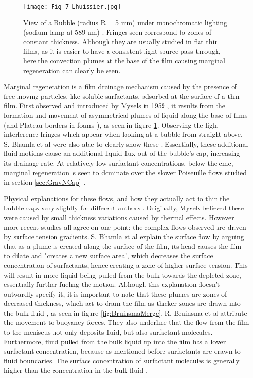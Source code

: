 \documentclass[a4paper,12pt]{article}
\numberwithin{equation}{section}
\numberwithin{figure}{section}
\numberwithin{table}{section}
\begin{document}
\begin{figure}[!htbp]
    \centering
    \captionsetup{width=.9\linewidth}
    \texttt{[image: Fig\_7\_Lhuissier.jpg]}
    \caption{View of a Bubble (radius R = 5 mm) under monochromatic lighting (sodium lamp at 589 nm) \cite{Lhuissier2011}. Fringes seen correspond to zones of constant thickness. Although they are usually studied in flat thin films, as it is easier to have a consistent light source pass through, here the convection plumes at the base of the film causing marginal regeneration can clearly be seen. }
    \label{fig:Lhuissier7}
\end{figure}

Marginal regeneration is a film drainage mechanism caused by the presence of free moving particles, like soluble surfactants, adsorbed at the surface of a thin film. First observed and introduced by Mysels in 1959 \cite{Mysels1959Book}, it results from the formation and movement of asymmetrical plumes of liquid along the base of films (and Plateau borders in foams \cite{Breward2002}), as seen in figure \ref{fig:Lhuissier7}. Observing the light interference fringes which appear when looking at a bubble from straight above, S. Bhamla et al were also able to clearly show these \cite{Bhamla2017}. Essentially, these additional fluid motions cause an additional liquid flux out of the bubble's cap, increasing its drainage rate. At relatively low surfactant concentrations, below the cmc, marginal regeneration is seen to dominate over the slower Poiseuille flows studied in section \ref{sec:GravNCap} \cite{Lhuissier2011, Bhamla2017}.

Physical explanations for these flows, and how they actually act to thin the bubble caps vary slightly for different authors \cite{Nierstrasz1999, Bhamla2017, Lhuissier2011, ChampougnyNotBare2016, Bruinsma1995}. Originally, Mysels \cite{Mysels1959Book} believed these were caused by small thickness variations caused by thermal effects. However, more recent studies all agree on one point: the complex flows observed are driven by surface tension gradients. S. Bhamla et al \cite{Bhamla2017} explain the surface flow by arguing that as a plume is created along the surface of the film, its head causes the film to dilate and "creates a new surface area", which decreases the surface concentration of surfactants, hence creating a zone of higher surface tension. This will result in more liquid being pulled from the bulk towards the depleted zone, essentially further fueling the motion. Although this explanation doesn't outwardly specify it, it is important to note that these plumes are zones of decreased thickness, which act to drain the film as thicker zones are drawn into the bulk fluid \cite{Lhuissier2011, Nierstrasz1999}, as seen in figure \ref{fig:BruinsmaMerge}. R. Bruinsma et al \cite{Bruinsma1995} attribute the movement to buoyancy forces. They also underline that the flow from the film to the meniscus not only deposits fluid, but also surfactant molecules. Furthermore, fluid pulled from the bulk liquid up into the film has a lower surfactant concentration, because as mentioned before surfactants are drawn to fluid boundaries. The surface concentration of surfactant molecules is generally higher than the concentration in the bulk fluid \cite{Gast1997}.
\end{document}
